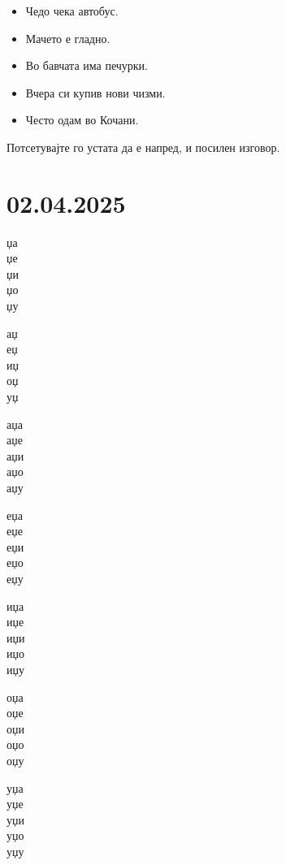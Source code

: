 \documentclass[a5paper,12pt]{article}
\newenvironment{instruction}{%
  \begin{tcolorbox}[colback=white,colframe=accentcolor,title={\textbf{Инструкции}},fonttitle=\bfseries] 
}{%
  \end{tcolorbox}
}
\begin{document}
\begin{itemize}
  \item Чедо чека автобус. 
  \item Мачето е гладно.
  \item Во бавчата има печурки.
  \item Вчера си купив нови чизми. 
  \item Често одам во Кочани.
\end{itemize}

\begin{instruction}
  Потсетувајте го устата да е напред, и посилен изговор.
\end{instruction}

\section{02.04.2025}
\begin{minipage}[t]{0.45\textwidth}
  џа\\ џе\\ џи\\ џо\\ џу
\end{minipage}
\hfill
\begin{minipage}[t]{0.45\textwidth}
  аџ\\ еџ\\ иџ\\ оџ\\ уџ
\end{minipage}

\vspace{1cm}

\begin{minipage}[t]{0.18\textwidth}
  аџа\\ аџе\\ аџи\\ аџо\\ аџу
\end{minipage}
\hfill
\begin{minipage}[t]{0.18\textwidth}
  еџа\\ еџе\\ еџи\\ еџо\\ еџу
\end{minipage}
\hfill
\begin{minipage}[t]{0.18\textwidth}
  иџа\\ иџе\\ иџи\\ иџо\\ иџу
\end{minipage}
\hfill 
\begin{minipage}[t]{0.18\textwidth}
  оџа\\ оџе\\ оџи\\ оџо\\ оџу
\end{minipage}
\hfill 
\begin{minipage}[t]{0.18\textwidth}
  уџа\\ уџе\\ уџи\\ уџо\\ уџу
\end{minipage}
\end{document}
